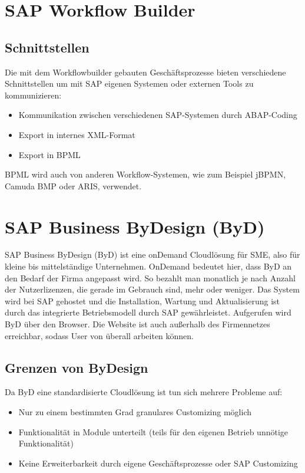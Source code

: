 \documentclass{handout}
\begin{document}
\newpage

\section{SAP Workflow Builder}


\newpage

\subsection{Schnittstellen}

Die mit dem Workflowbuilder gebauten Geschäftsprozesse bieten verschiedene Schnittstellen um mit SAP eigenen Systemen oder externen Tools zu kommunizieren:

\begin{itemize}
\item Kommunikation zwischen verschiedenen SAP-Systemen durch ABAP-Coding
\item Export in internes XML-Format
\item Export in BPML
\end{itemize}

BPML wird auch von anderen Workflow-Systemen, wie zum Beispiel jBPMN, Camuda BMP oder ARIS, verwendet.

\section{SAP Business ByDesign (ByD)}

SAP Business ByDesign (ByD) ist eine onDemand Cloudlösung für SME, also für kleine bis mittelständige Unternehmen. OnDemand bedeutet hier, dass ByD an den Bedarf der Firma angepasst wird. So bezahlt man monatlich je nach Anzahl der Nutzerlizenzen, die gerade im Gebrauch sind, mehr oder weniger. Das System wird bei SAP gehostet und die Installation, Wartung und Aktualisierung ist durch das integrierte Betriebsmodell durch SAP gewährleistet. Aufgerufen wird ByD über den Browser. Die Website ist auch außerhalb des Firmennetzes erreichbar, sodass User von überall arbeiten können.

\subsection{Grenzen von ByDesign}

Da ByD eine standardisierte Cloudlösung ist tun sich mehrere Probleme auf:

\begin{itemize}
\item Nur zu einem bestimmten Grad granulares Customizing möglich
\item Funktionalität in Module unterteilt (teils für den eigenen Betrieb unnötige Funktionalität)
\item Keine Erweiterbarkeit durch eigene Geschäftsprozesse oder SAP Customizing
\end{itemize}
\end{document}
